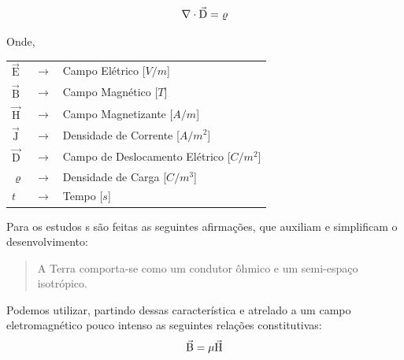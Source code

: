         \begin{equation}
            \label{lei-max-divD}
            \nabla \cdot \vec{\textrm{D}} = \varrho                
        \end{equation}
        
        \noindent Onde,
            
        {\footnotesize \noindent
            \begin{table}[H]
                \begin{tabular*}{1cm}{p{0.05cm}p{0.1cm}p{10cm}}
                    {\footnotesize $\vec{\textrm{E}}$}  & {\footnotesize $\rightarrow$} & {\footnotesize Campo Elétrico [$V/m$] }\\
                    {\footnotesize $\vec{\textrm{B}}$}  & {\footnotesize $\rightarrow$} & {\footnotesize Campo Magnético [$T$] }\\
                    {\footnotesize $\vec{\textrm{H}}$}  & {\footnotesize $\rightarrow$} & {\footnotesize Campo Magnetizante [$A/m$]} \\
                    {\footnotesize $\vec{\textrm{J}}$}  & {\footnotesize $\rightarrow$} & {\footnotesize Densidade de Corrente [$A/m^2$]} \\
                    {\footnotesize $\vec{\textrm{D}}$}  & {\footnotesize $\rightarrow$} & {\footnotesize Campo de Deslocamento Elétrico [$C/m^2$]} \\
                    {\footnotesize $\varrho$}           & {\footnotesize $\rightarrow$} & {\footnotesize Densidade de Carga [$C/m^3$]} \\
                    {\footnotesize $t$ }                & {\footnotesize $\rightarrow$} & {\footnotesize Tempo [$s$]}
                \end{tabular*}
            \end{table}}

        Para os estudos \mt s são feitas as seguintes afirmações, que auxiliam e simplificam o desenvolvimento:
       
        \begin{quote}
            A Terra comporta-se como um condutor ôhmico e um semi-espaço isotrópico.
        \end{quote}
        
        Podemos utilizar, partindo dessas característica e atrelado a um campo eletromagnético pouco intenso as seguintes relações constitutivas:
        \begin{equation}
         \vec{\textrm{B}} = \mu \vec{\textrm{H}}
        \end{equation}
        
